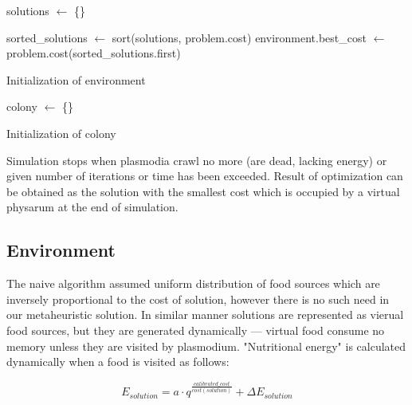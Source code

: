 \begin{algorithm}
  \BlankLine

  solutions $\leftarrow$ \{\}\;

  sorted\_solutions $\leftarrow$ sort(solutions, problem.cost)\;
  environment.best\_cost $\leftarrow$ problem.cost(sorted\_solutions.first)\;
  
  \;

  \caption{Initialization of environment}
  \label{algorithm:m_env_initialization}
\end{algorithm}

\begin{algorithm}
  \BlankLine

  colony $\leftarrow$ \{\}\;
  \;

  \caption{Initialization of colony}
  \label{algorithm:m_colony_initialization}
\end{algorithm}

Simulation stops when plasmodia crawl no more (are dead, lacking energy) or given number of iterations or time has been exceeded. Result of optimization can be obtained as the solution with the smallest cost which is occupied by a virtual physarum at the end of simulation.


\subsection{Environment}

The naive algorithm assumed uniform distribution of food sources which are inversely proportional to the cost of solution, however there is no such need in our metaheuristic solution. In similar manner solutions are represented as vierual food sources, but they are generated dynamically --- virtual food consume no memory unless they are visited by plasmodium. "Nutritional energy" is calculated dynamically when a food is visited as follows: 

\begin{equation}
  E_{solution} = a \cdot q^{\frac{calibrated\_cost}{cost(solution)}} + {\Delta}E_{solution}
  \label{equation:m_e_solution}
\end{equation}

